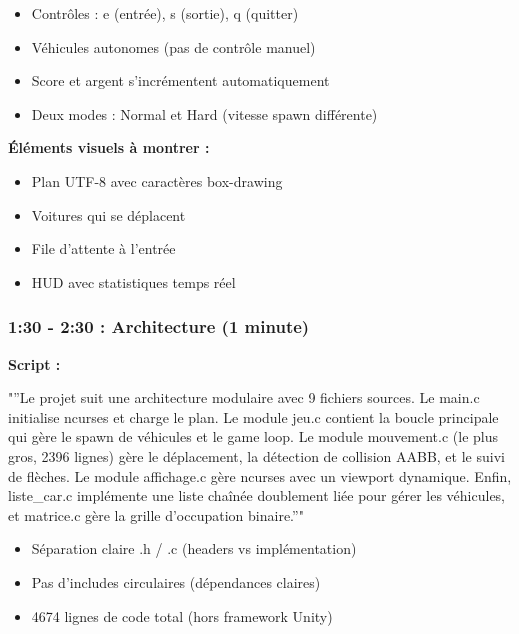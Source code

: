 \documentclass[12pt,a4paper]{article}
\newcommand{\sectiontime}[1]{%
    \textcolor{warningorange}{\textbf{#1}}
}
\begin{document}
\begin{points_cles}
\begin{itemize}[leftmargin=0.5cm]
    \item Contrôles : e (entrée), s (sortie), q (quitter)
    \item Véhicules autonomes (pas de contrôle manuel)
    \item Score et argent s'incrémentent automatiquement
    \item Deux modes : Normal et Hard (vitesse spawn différente)
\end{itemize}
\end{points_cles}

\textbf{Éléments visuels à montrer  :}
\begin{itemize}
    \item Plan UTF-8 avec caractères box-drawing
    \item Voitures qui se déplacent
    \item File d'attente à l'entrée
    \item HUD avec statistiques temps réel
\end{itemize}

\subsubsection{\sectiontime{1:30 - 2:30} : Architecture (1 minute)}

\begin{script_pitch}
\textbf{Script :}

"''Le projet suit une architecture modulaire avec 9 fichiers sources. Le main.c initialise ncurses et charge le plan. Le module jeu.c contient la boucle principale qui gère le spawn de véhicules et le game loop. Le module mouvement.c (le plus gros, 2396 lignes) gère le déplacement, la détection de collision AABB, et le suivi de flèches. Le module affichage.c gère ncurses avec un viewport dynamique. Enfin, liste\_car.c implémente une liste chaînée doublement liée pour gérer les véhicules, et matrice.c gère la grille d'occupation binaire.''"
\end{script_pitch}

\begin{points_cles}
\begin{itemize}[leftmargin=0.5cm]
    \item Séparation claire .h / .c (headers vs implémentation)
    \item Pas d'includes circulaires (dépendances claires)
    \item 4674 lignes de code total (hors framework Unity)
\end{itemize}
\end{points_cles}
\end{document}
